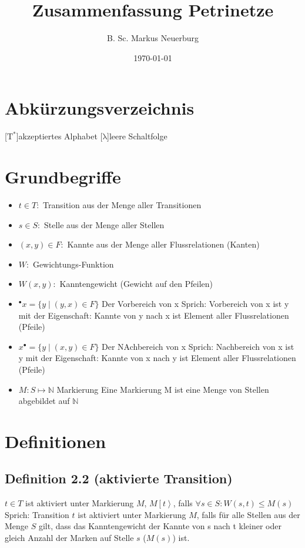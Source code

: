 \documentclass[12pt]{scrreprt}
\title{Zusammenfassung Petrinetze}
\author{B. Sc. Markus Neuerburg}
\date{\today}
\begin{document}
\setlength{\topmargin}{0cm}
\parindent 0pt
\onehalfspacing

\tableofcontents
\newpage
\chapter*{Abkürzungsverzeichnis}
\begin{acronym}[HBCI]
	[$\mathrm{T^*}$]{akzeptiertes Alphabet}
	[$\mathrm{\lambda}$]{leere Schaltfolge}
\end{acronym}

\chapter{Grundbegriffe}
\begin{itemize}
	\item $t \in T:$						\tabto{4cm} Transition aus der Menge aller Transitionen
	\item $s \in S:$						\tabto{4cm} Stelle aus der Menge aller Stellen
	\item $(x, y) \in F:$					\tabto{4cm} Kannte aus der Menge aller Flussrelationen (Kanten)
	\item $W:$								\tabto{4cm} Gewichtungs-Funktion
	\item $W(x, y):$						\tabto{4cm} Kanntengewicht (Gewicht auf den Pfeilen)
	\item $^\bullet x=\{y \mid (y,x) \in F \}$	\tabto{4cm} Der Vorbereich von x\newline
	Sprich: Vorbereich von x ist y mit der Eigenschaft: Kannte von y nach x ist Element aller Flussrelationen (Pfeile)
	\item $x^\bullet =\{y \mid (x, y) \in F\}$	\tabto{4cm} Der NAchbereich von x\newline
	Sprich: Nachbereich von x ist y mit der Eigenschaft: Kannte von x nach y ist Element aller Flussrelationen (Pfeile)
	\item $M:S\mapsto \mathbb{N}$			\tabto{4cm} Markierung\newline
	Eine Markierung M ist eine Menge von Stellen abgebildet auf $\mathbb{N}$
\end{itemize}

\chapter{Definitionen}
\section{Definition 2.2 (aktivierte Transition)}
$t \in T$ ist aktiviert unter Markierung $M$, $M\left[t\right>$, falls $\forall s \in S:W(s,t) \leq M(s)$\newline
	Sprich: Transition $t$ ist aktiviert unter Markierung $M$, falls für alle Stellen aus der Menge $S$ gilt, dass das Kanntengewicht der Kannte von s nach t kleiner oder gleich Anzahl der Marken auf Stelle $s$ ($M(s)$) ist.
\end{document}
